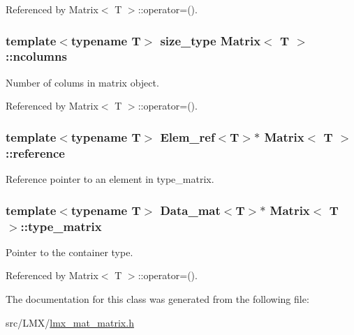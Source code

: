 Referenced by Matrix$<$ T $>$\-::operator=().

\hypertarget{classMatrix_a05a070e7ed8f3289d72c71b47888bef2}{
\subsubsection[{ncolumns}]{\setlength{\rightskip}{0pt plus 5cm}template$<$typename T$>$ {\bf size\-\_\-type} {\bf Matrix}$<$ T $>$\-::ncolumns\hspace{0.3cm}{\ttfamily [protected]}}}\label{classMatrix_a05a070e7ed8f3289d72c71b47888bef2}
Number of colums in matrix object. 

Referenced by Matrix$<$ T $>$\-::operator=().

\hypertarget{classMatrix_a0294600ba30c0665efcaeb77bbcad7fa}{
\subsubsection[{reference}]{\setlength{\rightskip}{0pt plus 5cm}template$<$typename T$>$ Elem\-\_\-ref$<$T$>$$\ast$ {\bf Matrix}$<$ T $>$\-::reference\hspace{0.3cm}{\ttfamily [protected]}}}\label{classMatrix_a0294600ba30c0665efcaeb77bbcad7fa}
Reference pointer to an element in type\-\_\-matrix. \hypertarget{classMatrix_a3ea7741164284aaa1ad49dec89a2d309}{
\subsubsection[{type\-\_\-matrix}]{\setlength{\rightskip}{0pt plus 5cm}template$<$typename T$>$ Data\-\_\-mat$<$T$>$$\ast$ {\bf Matrix}$<$ T $>$\-::type\-\_\-matrix\hspace{0.3cm}{\ttfamily [protected]}}}\label{classMatrix_a3ea7741164284aaa1ad49dec89a2d309}
Pointer to the container type. 

Referenced by Matrix$<$ T $>$\-::operator=().



The documentation for this class was generated from the following file\-:\begin{DoxyCompactItemize}
\item 
src/\-L\-M\-X/\hyperlink{lmx__mat__matrix_8h}{lmx\-\_\-mat\-\_\-matrix.\-h}\end{DoxyCompactItemize}

